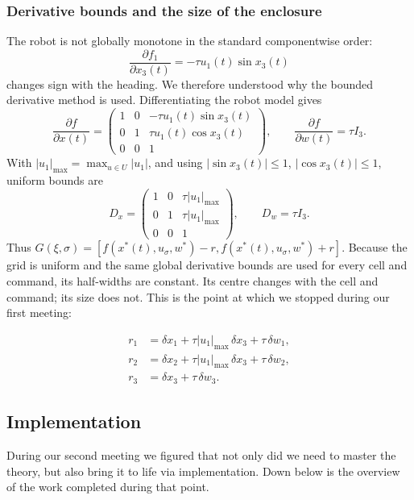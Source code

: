 \documentclass[11pt,a4paper]{article}
\begin{document}
\FloatBarrier
\subsubsection{Derivative bounds and the size of the enclosure}
The robot is not globally monotone in the standard componentwise order:
\[
 \frac{\partial f_1}{\partial x_3(t)}=-\tau u_1(t)\sin x_3(t)
\]
changes sign with the heading. We therefore understood why the bounded
derivative method is used. Differentiating the robot model gives
\[
 \frac{\partial f}{\partial x(t)}=
 \begin{pmatrix}
 1&0&-\tau u_1(t)\sin x_3(t)\\
 0&1&\tau u_1(t)\cos x_3(t)\\
 0&0&1
 \end{pmatrix},\qquad
 \frac{\partial f}{\partial w(t)}=\tau I_3.
\]
With $|u_1|_{\max}=\max_{u\in U}|u_1|$, and using
$|\sin x_3(t)|\le1$, $|\cos x_3(t)|\le1$, uniform bounds are
\[
 D_x=\begin{pmatrix}
 1&0&\tau|u_1|_{\max}\\
 0&1&\tau|u_1|_{\max}\\
 0&0&1
 \end{pmatrix},\qquad D_w=\tau I_3.
\]
Thus $G(\xi,\sigma)=[f(x^*(t),u_\sigma,w^*)-r,
f(x^*(t),u_\sigma,w^*)+r]$. Because the grid is uniform and the same global
derivative bounds are used for every cell and command, its half-widths
are constant. Its centre changes with the cell and command; its size
does not. This is the point at which we stopped during our first meeting:

\begin{tcolorbox}[title={Consequence: the same enclosure size for every cell}]
\begin{equation}
 \boxed{\begin{aligned}
 r_1&=\delta x_1+\tau|u_1|_{\max}\,\delta x_3+\tau\,\delta w_1,\\
 r_2&=\delta x_2+\tau|u_1|_{\max}\,\delta x_3+\tau\,\delta w_2,\\
 r_3&=\delta x_3+\tau\,\delta w_3.
 \end{aligned}}
\end{equation}
\end{tcolorbox}

\FloatBarrier


\subsection{Implementation}
\begin{tcolorbox}[title={Second meeting --- 11 October 2026}]
During our second meeting we figured that not only did we need to master the theory,
but also bring it to life via implementation. Down below is the overview of the work completed during that point.
\end{tcolorbox}
\end{document}
